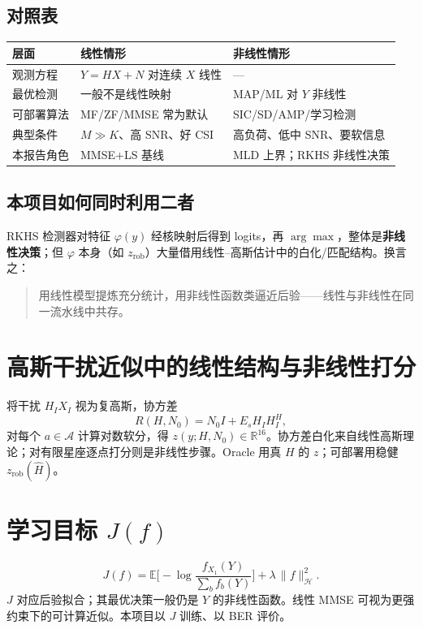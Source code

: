 \subsection{对照表}
\begin{center}
\begin{tabular}{lll}
\toprule
层面 & 线性情形 & 非线性情形 \\
\midrule
观测方程 & $Y=HX+N$ 对连续 $X$ 线性 & --- \\
最优检测 & 一般不是线性映射 & MAP/ML 对 $Y$ 非线性 \\
可部署算法 & MF/ZF/MMSE 常为默认 & SIC/SD/AMP/学习检测 \\
典型条件 & $M\gg K$、高 SNR、好 CSI & 高负荷、低中 SNR、要软信息 \\
本报告角色 & MMSE+LS 基线 & MLD 上界；RKHS 非线性决策 \\
\bottomrule
\end{tabular}
\end{center}

\subsection{本项目如何同时利用二者}
RKHS 检测器对特征 $\varphi(y)$ 经核映射后得到 logits，再 $\arg\max$，整体是\textbf{非线性决策}；但 $\varphi$ 本身（如 $z_{\mathrm{rob}}$）大量借用线性--高斯估计中的白化/匹配结构。换言之：
\begin{quote}
用线性模型提炼充分统计，用非线性函数类逼近后验——线性与非线性在同一流水线中共存。
\end{quote}

\section{高斯干扰近似中的线性结构与非线性打分}

将干扰 $H_I X_I$ 视为复高斯，协方差
\begin{equation}
R(H,N_0)= N_0 I + E_s H_I H_I^H,
\end{equation}
对每个 $a\in\mathcal{A}$ 计算对数软分，得 $z(y;H,N_0)\in\mathbb{R}^{16}$。协方差白化来自线性高斯理论；对有限星座逐点打分则是非线性步骤。Oracle 用真 $H$ 的 $z$；可部署用稳健 $z_{\mathrm{rob}}(\hat H)$。

\section{学习目标 $J(f)$}

\begin{equation}
J(f)=\mathbb{E}\Big[
-\log\frac{f_{X_1}(Y)}{\sum_b f_b(Y)}
\Big]
+\lambda\,\|f\|_{\mathcal{H}}^2.
\label{eq:J}
\end{equation}
$J$ 对应后验拟合；其最优决策一般仍是 $Y$ 的非线性函数。线性 MMSE 可视为更强约束下的可计算近似。本项目以 $J$ 训练、以 BER 评价。

